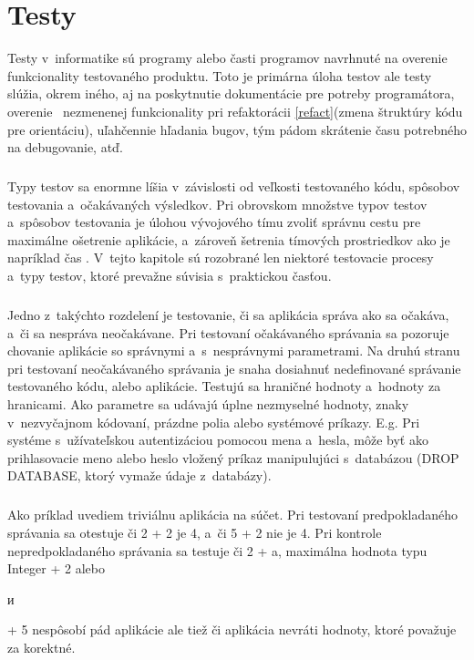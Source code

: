 \documentclass[
  digital, %
  table,   %
oneside,
  nolof,     %
  nolot,     %
]{fithesis3}
\begin{document}
\chapter{Testy}
Testy v~informatike sú programy alebo časti programov navrhnuté na overenie funkcionality testovaného produktu. Toto je primárna úloha testov ale testy slúžia, okrem iného, aj na poskytnutie dokumentácie pre potreby programátora, overenie \ nezmenenej funkcionality pri refaktorácii \ref{refact}(zmena štruktúry kódu pre orientáciu), uľahčennie hľadania bugov, tým pádom skrátenie času potrebného na debugovanie, atď.
 \paragraph{}
Typy testov sa enormne líšia v~závislosti od veľkosti testovaného kódu, spôsobov testovania a~očakávaných výsledkov. Pri obrovskom množstve typov testov a~spôsobov testovania je úlohou vývojového tímu zvoliť správnu cestu pre maximálne ošetrenie aplikácie, a~zároveň šetrenia tímových prostriedkov ako je napríklad čas \cite{ssl}. V~tejto kapitole sú rozobrané len niektoré testovacie procesy a~typy testov, ktoré prevažne súvisia s~praktickou časťou.\paragraph{}
Jedno z~takýchto rozdelení je  testovanie, či sa aplikácia správa ako sa očakáva, a~či sa nespráva neočakávane. Pri testovaní očakávaného správania sa pozoruje chovanie aplikácie so správnymi a~s~nesprávnymi parametrami. Na druhú stranu pri testovaní neočakávaného správania je snaha dosiahnuť nedefinované správanie  testovaného kódu, alebo aplikácie. Testujú sa hraničné hodnoty a~hodnoty za hranicami. Ako parametre sa udávajú úplne nezmyselné hodnoty, znaky v~nezvyčajnom kódovaní, prázdne polia alebo systémové príkazy. E.g. Pri systéme s~užívateľskou  autentizáciou pomocou mena a~hesla, môže byť ako prihlasovacie meno alebo heslo vložený príkaz manipulujúci s~databázou (DROP DATABASE, ktorý vymaže údaje z~databázy). \paragraph{}
Ako príklad uvediem triviálnu aplikácia na súčet. Pri testovaní predpokladaného správania sa otestuje či 2 + 2 je 4, a~či 5 + 2 nie je 4. Pri kontrole nepredpokladaného správania sa testuje či 2 + a, maximálna hodnota typu Integer + 2 alebo \begin{otherlanguage}{russian} и \end{otherlanguage}  + 5 nespôsobí pád aplikácie ale tiež či aplikácia nevráti hodnoty, ktoré považuje za korektné. \paragraph{}
\end{document}
